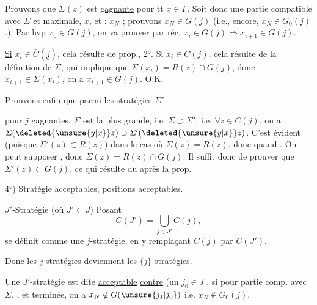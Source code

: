 Prouvons que $\Sigma(z)$ est \uline{gagnante} pour tt $x\in\Gamma$. Soit donc une partie  compatible avec $\Sigma$ et maximale,   $x$, et  : $x_N$ ; prouvons $x_N\in G(j)$ (i.e., encore, $x_N\in G_0(j)$ .). Par hyp $x_0\in G(j)$, on va prouver par réc.  $x_i\in G(j)\Rightarrow x_{i+1}\in G(j)$.

\uline{Si} $x_i\in\bar C(\underline{j})$, cela résulte de prop., 2°. Si $x_i\in C(j)$, cela résulte de la définition de $\Sigma$, qui implique que $\Sigma(x_i)=R(z)\cap G(j)$, donc  $x_{i+1}\in\Sigma(x_i)$, on a $x_{i+1}\in G(j)$. O.K.

Prouvons enfin que parmi les stratégies $\Sigma'$


pour $j$ \inserted{$\Gamma$-}gagnantes,  $\Sigma$ est la plus grande, i.e. $\Sigma\supset\Sigma'$, i.e. $\forall z\in C(j)$, on a $\Sigma(\deleted{\unsure{y|x}}z)\supset\Sigma'(\deleted{\unsure{y|x}}z)$. C'est évident (puisque $\Sigma'(z)\subset R(z)$)  dans le cas où $\Sigma(z)=R(z)$, donc quand  . On peut supposer  , donc $\Sigma(z)=R(z)\cap G(j)$. Il suffit donc de prouver que $\Sigma'(z)\subset G(j)$,  ce qui résulte du  après la prop.


4°) \uline{Stratégie acceptables}, \uline{positions acceptables}.

$J'$-Stratégie (où $J'\subset J$)  Posant
\[
C(J')=\bigcup_{j\in J'}C(j),
\]
se définit comme une $j$-stratégie, en y remplaçant $C(j)$ par $C(J')$.

Donc les $j$-stratégies deviennent les $\{j\}$-stratégies.

Une  $J'$-stratégie  est dite \uline{acceptable}   \uline{contre} (un \uline{$j_0$}$\in J$ , si pour  partie  comp. avec $\Sigma$,  , et terminée, on a $x_N\notin G(\unsure{j_1|j_0})$ i.e. $x_N\notin G_0(j)$.

